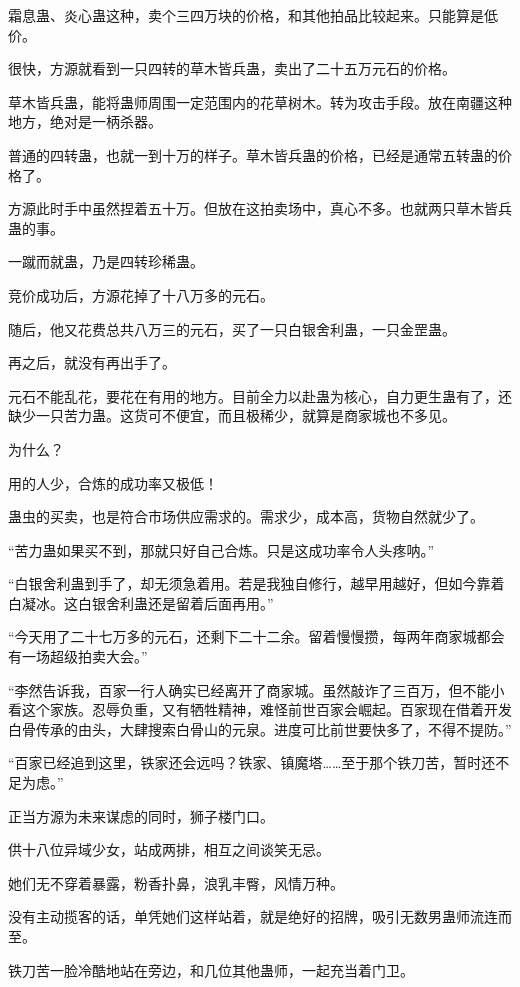 \begin{this_body}
霜息蛊、炎心蛊这种，卖个三四万块的价格，和其他拍品比较起来。只能算是低价。

很快，方源就看到一只四转的草木皆兵蛊，卖出了二十五万元石的价格。

草木皆兵蛊，能将蛊师周围一定范围内的花草树木。转为攻击手段。放在南疆这种地方，绝对是一柄杀器。

普通的四转蛊，也就一到十万的样子。草木皆兵蛊的价格，已经是通常五转蛊的价格了。

方源此时手中虽然捏着五十万。但放在这拍卖场中，真心不多。也就两只草木皆兵蛊的事。

一蹴而就蛊，乃是四转珍稀蛊。

竞价成功后，方源花掉了十八万多的元石。

随后，他又花费总共八万三的元石，买了一只白银舍利蛊，一只金罡蛊。

再之后，就没有再出手了。

元石不能乱花，要花在有用的地方。目前全力以赴蛊为核心，自力更生蛊有了，还缺少一只苦力蛊。这货可不便宜，而且极稀少，就算是商家城也不多见。

为什么？

用的人少，合炼的成功率又极低！

蛊虫的买卖，也是符合市场供应需求的。需求少，成本高，货物自然就少了。

“苦力蛊如果买不到，那就只好自己合炼。只是这成功率令人头疼呐。”

“白银舍利蛊到手了，却无须急着用。若是我独自修行，越早用越好，但如今靠着白凝冰。这白银舍利蛊还是留着后面再用。”

“今天用了二十七万多的元石，还剩下二十二余。留着慢慢攒，每两年商家城都会有一场超级拍卖大会。”

“李然告诉我，百家一行人确实已经离开了商家城。虽然敲诈了三百万，但不能小看这个家族。忍辱负重，又有牺牲精神，难怪前世百家会崛起。百家现在借着开发白骨传承的由头，大肆搜索白骨山的元泉。进度可比前世要快多了，不得不提防。”

“百家已经追到这里，铁家还会远吗？铁家、镇魔塔……至于那个铁刀苦，暂时还不足为虑。”

正当方源为未来谋虑的同时，狮子楼门口。

供十八位异域少女，站成两排，相互之间谈笑无忌。

她们无不穿着暴露，粉香扑鼻，浪乳丰臀，风情万种。

没有主动揽客的话，单凭她们这样站着，就是绝好的招牌，吸引无数男蛊师流连而至。

铁刀苦一脸冷酷地站在旁边，和几位其他蛊师，一起充当着门卫。


\end{this_body}
